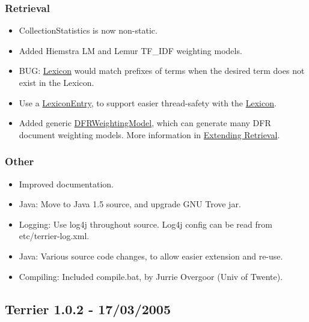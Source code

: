 \subsubsection{Retrieval}\label{retrieval-9}

\begin{itemize}
\tightlist
\item
  CollectionStatistics is now non-static.
\item
  Added Hiemstra LM and Lemur TF\_IDF weighting models.
\item
  BUG: \href{javadoc/org/terrier/structures/Lexicon.html}{Lexicon} would
  match prefixes of terms when the desired term does not exist in the
  Lexicon.
\item
  Use a
  \href{javadoc/org/terrier/structures/LexiconEntry.html}{LexiconEntry},
  to support easier thread-safety with the
  \href{javadoc/org/terrier/structures/Lexicon.html}{Lexicon}.
\item
  Added generic
  \href{javadoc/org/terrier/matching/models/DFRWeightingModel.html}{DFRWeightingModel},
  which can generate many DFR document weighting models. More
  information in \href{extend_retrieval.html}{Extending Retrieval}.
\end{itemize}

\subsubsection{Other}\label{other-9}

\begin{itemize}
\tightlist
\item
  Improved documentation.
\item
  Java: Move to Java 1.5 source, and upgrade GNU Trove jar.
\item
  Logging: Use log4j throughout source. Log4j config can be read from
  etc/terrier-log.xml.
\item
  Java: Various source code changes, to allow easier extension and
  re-use.
\item
  Compiling: Included compile.bat, by Jurrie Overgoor (Univ of Twente).
\end{itemize}

\subsection{Terrier 1.0.2 - 17/03/2005}\label{terrier-1.0.2---17032005}

